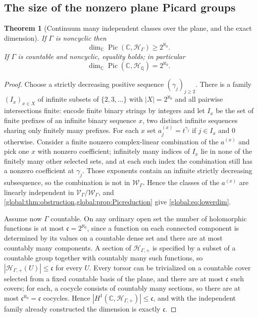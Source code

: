 \documentclass[11pt,letterpaper]{article}
\newtheorem{theorem}{Theorem}[section]
\theoremstyle{definition}
\theoremstyle{remark}
\newcommand{\C}{\mathbb C}
\newcommand{\Q}{\mathbb Q}
\newcommand{\HH}{\mathscr H_\Gamma}
\newcommand{\HP}{\mathscr H_{\Gamma,+}}
\newcommand{\Pic}{\operatorname{Pic}}
\newcommand{\abs}[1]{\left|#1\right|}
\numberwithin{equation}{section}
\begin{document}
\subsection{The size of the nonzero plane Picard groups}

\begin{theorem}[Continuum many independent classes over the plane, and the exact dimension]\label{global:thm:dimension}
If $\Gamma$ is noncyclic then
\begin{equation}\label{global:eq:lowerdim}
  \dim_\C\Pic(\C,\HH)\ge2^{\aleph_0}.
\end{equation}
If $\Gamma$ is countable and noncyclic, equality holds; in particular
\begin{equation}\label{global:eq:Qdim}
  \dim_\C\Pic(\C,\mathscr H_\Q)=2^{\aleph_0}.
\end{equation}
\end{theorem}

\begin{proof}
Choose a strictly decreasing positive sequence $(\gamma_j)_{j\ge2}$. There is a family $(I_x)_{x\in X}$ of infinite subsets of $\{2,3,\dots\}$ with $\abs X=2^{\aleph_0}$ and all pairwise intersections finite: encode finite binary strings by integers and let $I_x$ be the set of finite prefixes of an infinite binary sequence $x$, two distinct infinite sequences sharing only finitely many prefixes. For each $x$ set $a^{(x)}_j=t^{\gamma_j}$ if $j\in I_x$ and $0$ otherwise. Consider a finite nonzero complex-linear combination of the $a^{(x)}$ and pick one $x$ with nonzero coefficient; infinitely many indices of $I_x$ lie in none of the finitely many other selected sets, and at each such index the combination still has a nonzero coefficient at $\gamma_j$. Those exponents contain an infinite strictly decreasing subsequence, so the combination is not in $\mathcal W_\Gamma$. Hence the classes of the $a^{(x)}$ are linearly independent in $\mathcal V_\Gamma/\mathcal W_\Gamma$, and \cref{global:thm:obstruction,global:prop:Picreduction} give \eqref{global:eq:lowerdim}.

Assume now $\Gamma$ countable. On any ordinary open set the number of holomorphic functions is at most $\mathfrak c=2^{\aleph_0}$, since a function on each connected component is determined by its values on a countable dense set and there are at most countably many components. A section of $\HP$ is specified by a subset of a countable group together with countably many such functions, so $\abs{\HP(U)}\le\mathfrak c$ for every $U$. Every torsor can be trivialized on a countable cover selected from a fixed countable basis of the plane, and there are at most $\mathfrak c$ such covers; for each, a cocycle consists of countably many sections, so there are at most $\mathfrak c^{\aleph_0}=\mathfrak c$ cocycles. Hence $\abs{H^1(\C,\HP)}\le\mathfrak c$, and with the independent family already constructed the dimension is exactly $\mathfrak c$.
\end{proof}
\end{document}
